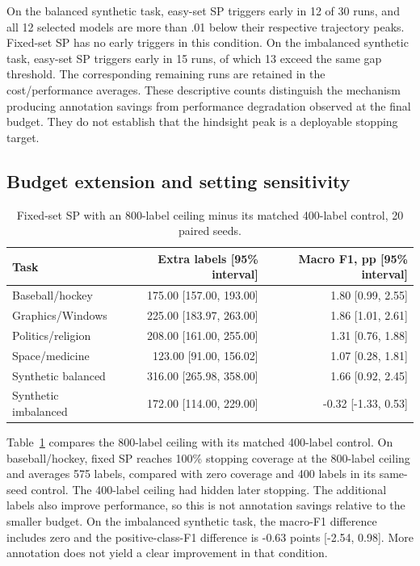 \documentclass[10pt,twocolumn]{article}
\begin{document}
On the balanced synthetic task, easy-set SP triggers early in 12 of 30 runs, and all 12 selected models are more than .01 below their respective trajectory peaks. Fixed-set SP has no early triggers in this condition. On the imbalanced synthetic task, easy-set SP triggers early in 15 runs, of which 13 exceed the same gap threshold. The corresponding remaining runs are retained in the cost/performance averages. These descriptive counts distinguish the mechanism producing annotation savings from performance degradation observed at the final budget. They do not establish that the hindsight peak is a deployable stopping target.

\subsection{Budget extension and setting sensitivity}
\begin{table}[t]
\centering\small
\begin{tabular}{lrr}
\toprule
Task & Extra labels [95\% interval] & Macro F1, pp [95\% interval]\\
\midrule
Baseball/hockey & 175.00 [157.00, 193.00] & 1.80 [0.99, 2.55]\\
Graphics/Windows & 225.00 [183.97, 263.00] & 1.86 [1.01, 2.61]\\
Politics/religion & 208.00 [161.00, 255.00] & 1.31 [0.76, 1.88]\\
Space/medicine & 123.00 [91.00, 156.02] & 1.07 [0.28, 1.81]\\
Synthetic balanced & 316.00 [265.98, 358.00] & 1.66 [0.92, 2.45]\\
Synthetic imbalanced & 172.00 [114.00, 229.00] & -0.32 [-1.33, 0.53]\\
\bottomrule
\end{tabular}
\caption{Fixed-set SP with an 800-label ceiling minus its matched 400-label control, 20 paired seeds.}\label{tab:budget}
\end{table}
Table~\ref{tab:budget} compares the 800-label ceiling with its matched 400-label control. On baseball/hockey, fixed SP reaches 100\% stopping coverage at the 800-label ceiling and averages 575 labels, compared with zero coverage and 400 labels in its same-seed control. The 400-label ceiling had hidden later stopping. The additional labels also improve performance, so this is not annotation savings relative to the smaller budget. On the imbalanced synthetic task, the macro-F1 difference includes zero and the positive-class-F1 difference is -0.63 points [-2.54, 0.98]. More annotation does not yield a clear improvement in that condition.
\end{document}
